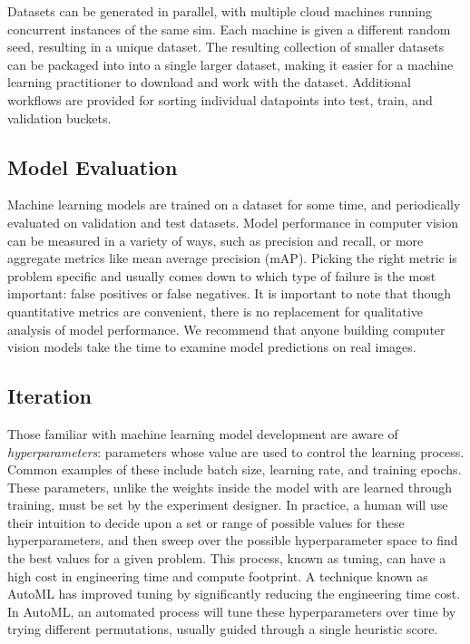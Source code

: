 \documentclass{article}
\begin{document}
Datasets can be generated in parallel, with multiple cloud machines running concurrent instances of the same sim. Each machine is given a different random seed, resulting in a unique dataset. The resulting collection of smaller datasets can be packaged into into a single larger dataset, making it easier for a machine learning practitioner to download and work with the dataset. Additional workflows are provided for sorting individual datapoints into test, train, and validation buckets.

\subsection{Model Evaluation}
\label{sec:evaluation}

Machine learning models are trained on a dataset for some time, and periodically evaluated on validation and test datasets. Model performance in computer vision can be measured in a variety of ways, such as precision and recall, or more aggregate metrics like mean average precision (mAP). Picking the right metric is problem specific and usually comes down to which type of failure is the most important: false positives or false negatives. It is important to note that though quantitative metrics are convenient, there is no replacement for qualitative analysis of model performance. We recommend that anyone building computer vision models take the time to examine model predictions on real images.

\subsection{Iteration}
\label{sec:iteration}

Those familiar with machine learning model development are aware of \emph{hyperparameters}: parameters whose value are used to control the learning process. Common examples of these include batch size, learning rate, and training epochs. These parameters, unlike the weights inside the model with are learned through training, must be set by the experiment designer. In practice, a human will use their intuition to decide upon a set or range of possible values for these hyperparameters, and then sweep over the possible hyperparameter space to find the best values for a given problem. This process, known as tuning, can have a high cost in engineering time and compute footprint. A technique known as AutoML has improved tuning by significantly reducing the engineering time cost. In AutoML, an automated process will tune these hyperparameters over time by trying different permutations, usually guided through a single heuristic score.
\end{document}
